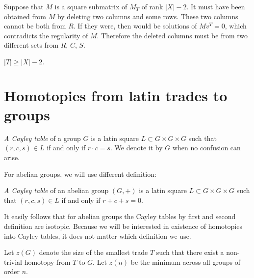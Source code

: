 \begin{note}
Suppose that $M$ is a square submatrix of $M_T$ of rank $|X|-2$. It must have been obtained from $M$ by deleting two columns and some rows. These two columns cannot be both from $R$. If they were, then
%
would be solutions of $Mv^T = 0$, which contradicts the regularity of $M$. Therefore the deleted columns must be from two different sets from $R$, $C$, $S$.
\end{note}


\begin{cor}
\label{cor:size-of-t}
$|T| \geq |X|-2$.
\end{cor}

\section{Homotopies from latin trades to groups}

\begin{defn}
\emph{A Cayley table} of a group $G$ is a latin square $L \subset G \times G \times G$ such that $(r,c,s) \in L$ if and only if $r \cdot c = s$. We denote it by $G$ when no confusion can arise.
\end{defn}

For abelian groups, we will use different definition:

\begin{defn}
\emph{A Cayley table} of an abelian group $(G,+)$ is a latin square $L \subset G \times G \times G$ such that $(r,c,s) \in L$ if and only if $r + c + s = 0$.
\end{defn}

It easily follows that for abelian groups the Cayley tables by first and second definition are isotopic. Because we will be interested in existence of homotopies into Cayley tables, it does not matter which definition we use.

\begin{defn}
Let $z(G)$ denote the size of the smallest trade $T$ such that there exist a non-trivial homotopy from $T$ to $G$. Let \emph{$z(n)$} be the minimum across all groups of order $n$.
\end{defn}


